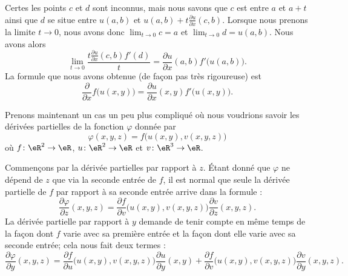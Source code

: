Certes les points $c$ et $d$ sont inconnus, mais nous savons que $c$ est entre $a$ et $a+t$ ainsi que $d$ se situe entre $u(a,b)$ et $u(a,b)+t\frac{ \partial u }{ \partial x }(c,b)$. Lorsque nous prenons la limite $t\to 0$, nous avons donc $\lim_{t\to 0} c=a$ et $\lim_{t\to 0} d=u(a,b)$. Nous avons alors
\begin{equation}
	\lim_{t\to 0} \frac{ t\frac{ \partial u }{ \partial x }(c,b)f'(d) }{ t }=\frac{ \partial u }{ \partial x }(a,b)f'\big( u(a,b) \big).
\end{equation}
La formule que nous avons obtenue (de façon pas très rigoureuse) est
\begin{equation}
	\frac{ \partial  }{ \partial x }f\big( u(x,y) \big)=\frac{ \partial u }{ \partial x }(x,y)f'\big( u(x,y) \big).
\end{equation}

Prenons maintenant un cas un peu plus compliqué où nous voudrions savoir les dérivées partielles de la fonction $\varphi$ donnée par
\begin{equation}
	\varphi(x,y,z)=f\big( u(x,y),v(x,y,z) \big)
\end{equation}
où $f\colon \eR^2\to \eR$, $u\colon \eR^2\to \eR$ et $v\colon \eR^3\to \eR$. 

Commençons par la dérivée partielles par rapport à $z$. Étant donné que $\varphi$ ne dépend de $z$ que via la seconde entrée de $f$, il est normal que seule la dérivée partielle de $f$ par rapport à sa seconde entrée arrive dans la formule :
\begin{equation}
	\frac{ \partial \varphi }{ \partial z }(x,y,z)=\frac{ \partial f }{ \partial v }\big( u(x,y),v(x,y,z) \big)\frac{ \partial v }{ \partial z }(x,y,z).
\end{equation}
La dérivée partielle par rapport à $y$ demande de tenir compte en même temps de la façon dont $f$ varie avec sa première entrée et la façon dont elle varie avec sa seconde entrée; cela nous fait deux termes :
\begin{equation}
	\frac{ \partial \varphi }{ \partial y }(x,y,z)=\frac{ \partial f }{ \partial u }\big( u(x,y),v(x,y,z) \big)\frac{ \partial u }{ \partial y }(x,y)+\frac{ \partial f }{ \partial v }\big( u(x,y),v(x,y,z) \big)\frac{ \partial v }{ \partial y }(x,y,z).
\end{equation}


